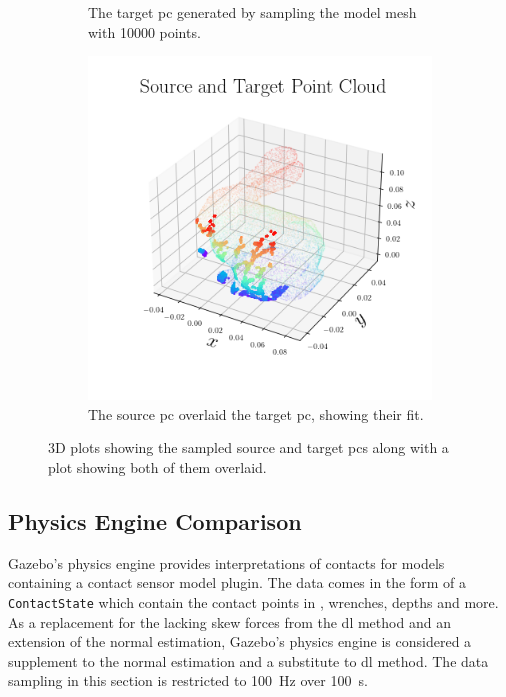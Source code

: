\begin{figure}[!h]
\begin{subfigure}[b]{0.3\textwidth}
		\caption{The target \gls{pc} generated by sampling the model mesh with \num{10 000} points.}
		\label{fig:pc-target}
	\end{subfigure}
	\hfill
	\begin{subfigure}[b]{0.3\textwidth}
		\centering
		\includegraphics[width=\textwidth]{chapters/1-tactile-perception/fig/matplotlib/pc_source_target.png}
		\caption{The source \gls{pc} overlaid the target \gls{pc}, showing their fit.}
		\label{fig:pc-source-and-target}
	\end{subfigure}
	\caption{3D plots showing the sampled source and target \gls{pc}s along with a plot showing both of them overlaid.}
	\label{fig:contact-position-gazebo}
\end{figure}


\subsection{Physics Engine Comparison}\label{sec:1-tactile-perception-results-gazebo-comparison}

Gazebo's physics engine provides interpretations of contacts for models containing a contact sensor model plugin. The data comes in the form of a \texttt{ContactState} which contain the contact points in , wrenches, depths and more. As a replacement for the lacking skew forces from the \gls{dl} method and an extension of the normal estimation, Gazebo's physics engine is considered a supplement to the normal estimation and a substitute to \gls{dl} method. The data sampling in this section is restricted to \SI{100}{\hertz} over \SI{100}{\second}. \medskip

